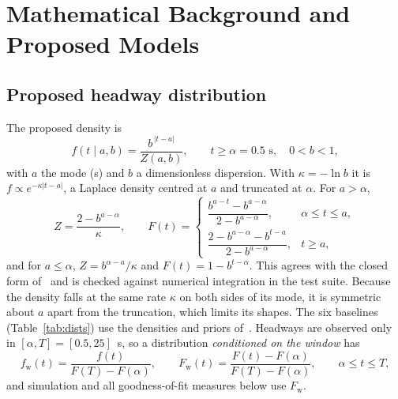 \documentclass[10pt,a4paper]{article}
\numberwithin{equation}{section}
\begin{document}
\section{Mathematical Background and Proposed Models}\label{sec:math}

\subsection{Proposed headway distribution}\label{sec:proposed}
The proposed density is
\begin{equation}\label{eq:density}
f(t\mid a,b)=\frac{b^{\,|t-a|}}{Z(a,b)},\qquad t\ge\alpha=0.5\text{ s},\quad 0<b<1,
\end{equation}
with $a$ the mode (s) and $b$ a dimensionless dispersion. With $\kappa=-\ln b$ it is $f\propto e^{-\kappa|t-a|}$, a Laplace density centred at $a$ and truncated at $\alpha$. For $a>\alpha$,
\begin{equation}\label{eq:norm}
Z=\frac{2-b^{a-\alpha}}{\kappa},\qquad
F(t)=\begin{cases}
\dfrac{b^{a-t}-b^{a-\alpha}}{2-b^{a-\alpha}}, & \alpha\le t\le a,\\[1.5ex]
\dfrac{2-b^{a-\alpha}-b^{t-a}}{2-b^{a-\alpha}}, & t\ge a,
\end{cases}
\end{equation}
and for $a\le\alpha$, $Z=b^{\alpha-a}/\kappa$ and $F(t)=1-b^{t-\alpha}$. This agrees with the closed form of~\cite{leungbootnak} and is checked against numerical integration in the test suite.
Because the density falls at the same rate $\kappa$ on both sides of its mode, it is symmetric about $a$ apart from the truncation, which limits its shapes.
The six baselines (Table~\ref{tab:dists}) use the densities and priors of~\cite{leungbootnak}. Headways are observed only in $[\alpha,T]=[0.5,25]$~s, so a distribution \emph{conditioned on the window} has
\begin{equation}\label{eq:trunc}
f_{\mathrm{w}}(t)=\frac{f(t)}{F(T)-F(\alpha)},\qquad F_{\mathrm{w}}(t)=\frac{F(t)-F(\alpha)}{F(T)-F(\alpha)},\qquad \alpha\le t\le T,
\end{equation}
and simulation and all goodness-of-fit measures below use $F_{\mathrm w}$.
\end{document}
